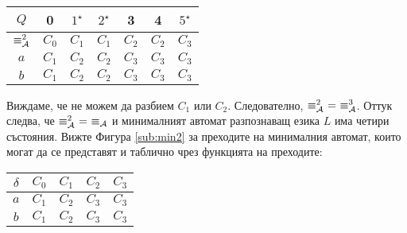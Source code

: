 {\begin{solution}
\begin{multicols}{2}
\begin{itemize}
      \begin{tabular}{|c|c|c|c|c|c|c|}
        \hline
        $Q$ & 0 & $1^\star$ & $2^\star$ & 3 & 4 & $5^\star$ \\
        \hline
        \hline
        $\equiv^2_{\mathcal{A}}$ & $C_0$ & $C_1$ & $C_1$ & $C_2$ & $C_2$ & $C_3$\\
        \hline
        $a$ & $C_1$ & $C_2$ & $C_2$ & $C_3$ & $C_3$ & $C_3$\\
        \hline
        $b$ & $C_1$ & $C_2$ & $C_2$ & $C_3$ & $C_3$ & $C_3$\\
        \hline
      \end{tabular}
      
      Виждаме, че не можем да разбием $C_1$ или $C_2$.
      Следователно, $\equiv^2_\A\ =\ \equiv^3_\A$.
      Оттук следва, че $\equiv^2_{\mathcal{A}}\ =\ \equiv_{\mathcal{A}}$ и минималният автомат разпознаващ езика $L$
      има четири състояния. Вижте Фигура \ref{sub:min2} за преходите на минималния автомат,
      които могат да се представят и таблично чрез функцията на преходите:

      \begin{tabular}{|c|c|c|c|c|}
        \hline
        $\delta$ & $C_0$ & $C_1$ & $C_2$ & $C_3$ \\
        \hline
        $a$ & $C_1$ & $C_2$ & $C_3$ & $C_3$ \\
        \hline
        $b$ & $C_1$ & $C_2$ & $C_3$ & $C_3$ \\
        \hline
      \end{tabular}
      
  \end{itemize}      
    \end{multicols}
\end{solution}
}

